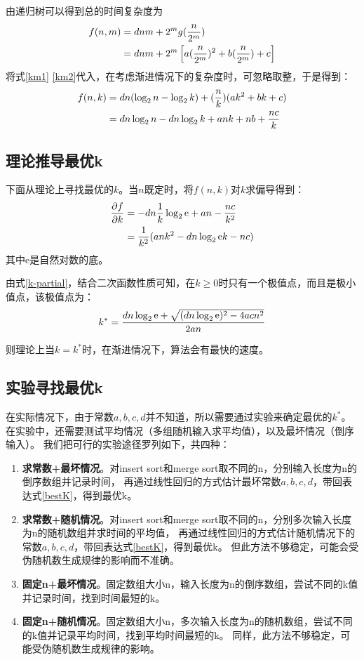 \documentclass{article}
\begin{document}
	由递归树可以得到总的时间复杂度为
	\begin{align}
		f(n,m) &= dnm +  2^mg(\frac{n}{2^m})  \notag \\
		&= dnm + 2^m\left[a(\frac{n}{2^m})^2 + b(\frac{n}{2^m}) +c\right]
	\end{align}
	将式\eqref{km1} \eqref{km2}代入，在考虑渐进情况下的复杂度时，可忽略取整，于是得到：
	\begin{align}
		f(n,k) &= dn(\log_2n - \log_2k) + (\frac{n}{k})(ak^2 + bk +c)  \notag \\
			   &= dn\log_2n - dn\log_2k + ank + nb + \frac{nc}{k} 
	\end{align} 

\subsection{理论推导最优k}
	下面从理论上寻找最优的$k$。当$n$既定时，将$f(n,k)$对$k$求偏导得到：
	\begin{align}
		\frac{\partial f}{\partial k} 
		&= -dn\frac{1}{k}\log_2\text{e} + an - \frac{nc}{k^2} \notag  \\
		&= \frac{1}{k^2}(ank^2 - dn\log_2\text{e}k - nc) \label{k-partial}
	\end{align}
	其中e是自然对数的底。
	
	由式\eqref{k-partial}，结合二次函数性质可知，在$k\ge 0$时只有一个极值点，而且是极小值点，该极值点为：
	\begin{equation}
		k^* = \frac{dn\log_2\text{e} + \sqrt{(dn\log_2\text{e})^2 - 4acn^2}}{2an} \label{bestK} \\
	\end{equation}
	
	则理论上当$k=k^*$时，在渐进情况下，算法会有最快的速度。

\subsection{实验寻找最优k}
	在实际情况下，由于常数$a,b,c,d$并不知道，所以需要通过实验来确定最优的$k^*$。
	在实验中，还需要测试平均情况（多组随机输入求平均值），以及最坏情况（倒序输入）。
	我们把可行的实验途径罗列如下，共四种：
	\begin{enumerate}
		\item \textbf{求常数+最坏情况}。对insert sort和merge sort取不同的n，分别输入长度为n的倒序数组并记录时间，
			再通过线性回归的方式估计最坏常数$a,b,c,d$，带回表达式\eqref{bestK}，得到最优k。
		\item \textbf{求常数+随机情况}。对insert sort和merge sort取不同的n，分别多次输入长度为n的随机数组并求时间的平均值，
			再通过线性回归的方式估计随机情况下的常数$a,b,c,d$，带回表达式\eqref{bestK}，得到最优k。
			但此方法不够稳定，可能会受伪随机数生成规律的影响而不准确。
		\item \textbf{固定n+最坏情况}。固定数组大小n，输入长度为n的倒序数组，尝试不同的k值并记录时间，找到时间最短的k。
		\item \textbf{固定n+随机情况}。固定数组大小n，多次输入长度为n的随机数组，尝试不同的k值并记录平均时间，找到平均时间最短的k。
			同样，此方法不够稳定，可能受伪随机数生成规律的影响。
	\end{enumerate}
	
\end{document}

